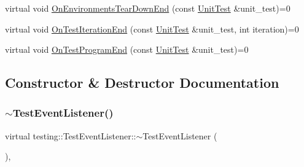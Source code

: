 \begin{DoxyCompactItemize}
\item 
virtual void \mbox{\hyperlink{classtesting_1_1_test_event_listener_a9ea04fa7f447865ba76df35e12ba2092}{On\+Environments\+Tear\+Down\+End}} (const \mbox{\hyperlink{classtesting_1_1_unit_test}{Unit\+Test}} \&unit\+\_\+test)=0
\item 
virtual void \mbox{\hyperlink{classtesting_1_1_test_event_listener_a550fdb3e55726e4cefa09f5697941425}{On\+Test\+Iteration\+End}} (const \mbox{\hyperlink{classtesting_1_1_unit_test}{Unit\+Test}} \&unit\+\_\+test, int iteration)=0
\item 
virtual void \mbox{\hyperlink{classtesting_1_1_test_event_listener_ad15b6246d94c268e233487a86463ef3d}{On\+Test\+Program\+End}} (const \mbox{\hyperlink{classtesting_1_1_unit_test}{Unit\+Test}} \&unit\+\_\+test)=0
\end{DoxyCompactItemize}


\subsection{Constructor \& Destructor Documentation}
\mbox{\label{classtesting_1_1_test_event_listener_a4512d19e7a108ec4926239ec1ea85d63}} 
\subsubsection{\texorpdfstring{$\sim$TestEventListener()}{~TestEventListener()}\hspace{0.1cm}{\footnotesize\ttfamily [1/3]}}
{\footnotesize\ttfamily virtual testing\+::\+Test\+Event\+Listener\+::$\sim$\+Test\+Event\+Listener (\begin{DoxyParamCaption}{ }\end{DoxyParamCaption})\hspace{0.3cm}{\ttfamily [inline]}, {\ttfamily [virtual]}}

\mbox{\label{classtesting_1_1_test_event_listener_a4512d19e7a108ec4926239ec1ea85d63}} 
